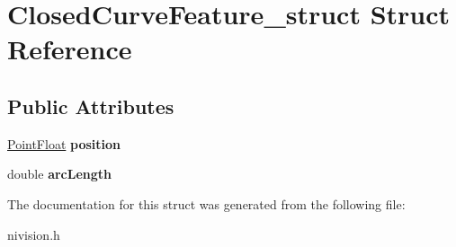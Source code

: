 \hypertarget{structClosedCurveFeature__struct}{\section{\-Closed\-Curve\-Feature\-\_\-struct \-Struct \-Reference}
\label{structClosedCurveFeature__struct}
}
\subsection*{\-Public \-Attributes}
\begin{DoxyCompactItemize}
\item 
\hypertarget{structClosedCurveFeature__struct_afbc1f807f0b4e584b7fcd6917869e441}{\hyperlink{structPointFloat__struct}{\-Point\-Float} {\bfseries position}}\label{structClosedCurveFeature__struct_afbc1f807f0b4e584b7fcd6917869e441}

\item 
\hypertarget{structClosedCurveFeature__struct_a2508935b29c1acafb613b000d550abcb}{double {\bfseries arc\-Length}}\label{structClosedCurveFeature__struct_a2508935b29c1acafb613b000d550abcb}

\end{DoxyCompactItemize}


\-The documentation for this struct was generated from the following file\-:\begin{DoxyCompactItemize}
\item 
nivision.\-h\end{DoxyCompactItemize}
